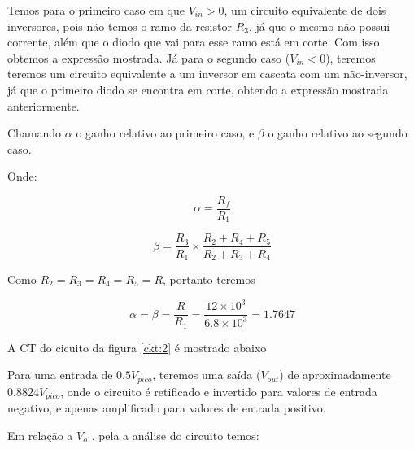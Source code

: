 Temos para o primeiro caso em que $V_{in}>0$, um circuito equivalente de dois inversores, pois não temos o ramo da resistor $R_3$, já que o mesmo não possui corrente, além que o diodo que vai para esse ramo está em corte. Com isso obtemos a expressão mostrada. Já para o segundo caso ($V_{in}<0$), teremos teremos um circuito equivalente a um inversor em cascata com um não-inversor, já que o primeiro diodo se encontra em corte, obtendo a expressão mostrada anteriormente.

Chamando $\alpha$ o ganho relativo ao primeiro caso, e $\beta$ o ganho relativo ao segundo caso.

Onde:
    \begin{center}
        \begin{equation} \label{vsat+}
            \alpha = \frac{R_f}{R_1}
        \end{equation}
    \end{center}
    
\vspace{10pt}
  \begin{center}
        \begin{equation} \label{vsat+}
            \beta = \frac{R_3}{R_1} \times \frac{R_2 + R_4 + R_5}{R_2 + R_3 + R_4}
        \end{equation}
  \end{center}

Como $R_2 = R_3 = R_4 = R_5 = R$, portanto teremos \\

\begin{center}
        \begin{equation} \label{vsat+}
            \alpha = \beta = \frac{R}{R_1} = \frac{12\times 10^3}{6.8\times 10^3} = 1.7647
        \end{equation} 
  \end{center}
 A CT do cicuito da figura \ref{ckt:2} é mostrado abaixo
 
 
 
 Para uma entrada de $0.5V_{pico}$, teremos uma saída ($V_{out}$) de aproximadamente $0.8824V_{pico}$, onde o circuito é retificado e invertido para valores de entrada negativo, e apenas amplificado para valores de entrada positivo.
 
Em relação a $V_{o1}$, pela a análise do circuito temos:

